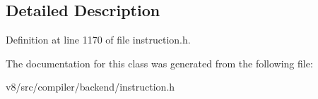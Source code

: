 \subsection{Detailed Description}


Definition at line 1170 of file instruction.\+h.



The documentation for this class was generated from the following file\+:\begin{DoxyCompactItemize}
\item 
v8/src/compiler/backend/instruction.\+h\end{DoxyCompactItemize}
